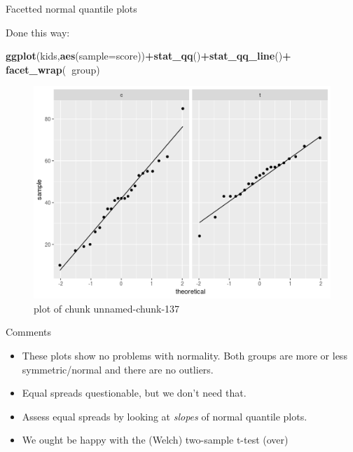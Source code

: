 \documentclass[ignorenonframetext,]{beamer}
\newenvironment{Shaded}{\begin{snugshade}}{\end{snugshade}}
\newcommand{\DataTypeTok}[1]{\textcolor[rgb]{0.13,0.29,0.53}{#1}}
\newcommand{\KeywordTok}[1]{\textcolor[rgb]{0.13,0.29,0.53}{\textbf{#1}}}
\newcommand{\NormalTok}[1]{#1}
\newcommand{\OperatorTok}[1]{\textcolor[rgb]{0.81,0.36,0.00}{\textbf{#1}}}
\providecommand{\tightlist}{%
  \setlength{\itemsep}{0pt}\setlength{\parskip}{0pt}}
\begin{document}
\begin{frame}[fragile]{Facetted normal quantile plots}
\protect\hypertarget{facetted-normal-quantile-plots}{}

Done this way:

\begin{Shaded}
\begin{Highlighting}[]
\KeywordTok{ggplot}\NormalTok{(kids,}\KeywordTok{aes}\NormalTok{(}\DataTypeTok{sample=}\NormalTok{score))}\OperatorTok{+}\KeywordTok{stat_qq}\NormalTok{()}\OperatorTok{+}\KeywordTok{stat_qq_line}\NormalTok{()}\OperatorTok{+}
\KeywordTok{facet_wrap}\NormalTok{(}\OperatorTok{~}\NormalTok{group)}
\end{Highlighting}
\end{Shaded}

\begin{figure}
\centering
\includegraphics{figure/unnamed-chunk-137-1.png}
\caption{plot of chunk unnamed-chunk-137}
\end{figure}

\end{frame}

\begin{frame}{Comments}
\protect\hypertarget{comments-6}{}

\begin{itemize}
\tightlist
\item
  These plots show no problems with normality. Both groups are more or
  less symmetric/normal and there are no outliers.
\item
  Equal spreads questionable, but we don't need that.
\item
  Assess equal spreads by looking at \emph{slopes} of normal quantile
  plots.
\item
  We ought be happy with the (Welch) two-sample t-test (over)
\end{itemize}

\end{frame}
\end{document}
